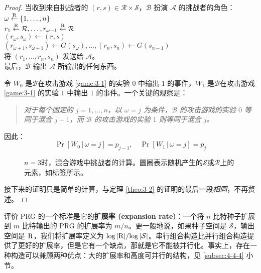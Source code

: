 \begin{proof}
\hspace*{5pt} 当收到来自挑战者的 $(r,s)\in\mathcal{R}\times\mathcal{S}$，$\mathcal B$ 扮演 $\mathcal A$ 的挑战者的角色：\\
\hspace*{50pt} $\omega\overset{\rm R}\leftarrow\{1,\dots,n\}$\\
\hspace*{50pt} $r_1\overset{\rm R}\leftarrow\mathcal R,\dots,r_{\omega-1}\overset{\rm R}\leftarrow\mathcal R$\\
\hspace*{50pt} $(r_{\omega},s_{\omega})\leftarrow(r,s)$\\
\hspace*{50pt} $(r_{\omega+1},s_{\omega+1})\leftarrow G(s_{\omega}),\dots,(r_n,s_n)\leftarrow G(s_{n-1})$\\
\hspace*{50pt} 将 $(r_1,\dots,r_n,s_n)$ 发送给 $\mathcal A$。\\
\hspace*{26pt} 最后，$\mathcal B$ 输出 $\mathcal A$ 所输出的任何东西。

\vspace*{5pt}

令 $W_0$ 是$\mathcal B$在攻击游戏 \ref{game:3-1} 的实验 $0$ 中输出 $1$ 的事件，$W_1$ 是$\mathcal B$在攻击游戏 \ref{game:3-1} 的实验 $1$ 中输出 $1$ 的事件。一个关键的观察是：
\begin{quote}
\emph{对于每个固定的 $j=1,\dots,n$，以 $\omega=j$ 为条件，$\mathcal B$ 的攻击游戏的实验 $0$ 等同于混合 $j-1$，而 $\mathcal B$ 的攻击游戏的实验 $1$ 则等同于混合 $j$。
}
\end{quote}
因此：
$$
\Pr[W_0\,|\,\omega=j]=p_{j-1},\quad
\Pr[W_1\,|\,\omega=j]=p_{j}
$$

\begin{figure}
	\centering
	
	\caption{$n=3$时，混合游戏中挑战者的计算。圆圈表示随机产生的$\mathcal{S}$或$\mathcal{R}$上的元素，如标签所示。}
	\label{fig:3-7}
\end{figure}

接下来的证明只是简单的计算，与定理 \ref{theo:3-2} 的证明的最后一段\emph{相同}，不再赘述。
\end{proof}

评价 PRG 的一个标准是它的\textbf{扩展率 (expansion rate)}：一个将 $n$ 比特种子扩展到 $m$ 比特输出的 PRG 的扩展率为 ${m}/{n}$。更一般地说，如果种子空间是 $\mathcal{S}$，输出空间是 $\mathcal{\rm R}$，我们将扩展率定义为 ${\log|\mathcal{\rm R}|}/{\log|\mathcal{S}|}$。串行组合构造比并行组合构造提供了更好的扩展率，但是它有一个缺点，那就是它不能被并行化。事实上，存在一种构造可以兼顾两种优点：大的扩展率和高度可并行的结构，见 \ref{subsec:4-4-4} 小节。

